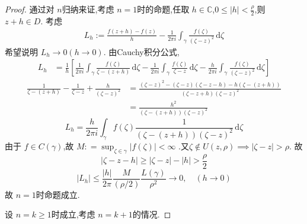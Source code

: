 \documentclass[../../复变函数.tex]{subfiles}
\begin{document}
\begin{proof}
    通过对 \(  n  \)归纳来证,考虑 \(  n = 1  \)时的命题,任取 \(  h \in \mathbb{C}   \),\(  0\le \left| h \right|<\frac{\rho  }{2 }    \),则 \(  z+ h\in D  \). 考虑\[
    \begin{aligned}
   L_{h}:=  \frac{f\left( z+ h \right)-f\left( z \right)   }{h }-\frac{1 }{2\pi i }\int_{ \gamma }\frac{f\left( \zeta  \right)  }{\left( \zeta -z \right)^{2}  }\,\mathrm{d} \zeta     
    \end{aligned}
    \]  希望说明 \(  L_{h}\to 0\left( h\to 0 \right)   \).   由Cauchy积分公式,  \[
    \begin{aligned}
    L_{h}& =  \frac{1}{h}\left[ \frac{1 }{2\pi i }\int_{ \gamma }\frac{f\left( \zeta  \right)  }{\zeta -\left( z+ h \right)  }\,\mathrm{d} \zeta -\frac{1 }{2\pi i }\int_{ \gamma }\frac{f\left( \zeta  \right)  }{\zeta -z }\,\mathrm{d} \zeta -\frac{h }{2\pi i } \int_{ \gamma }\frac{f\left( \zeta  \right)  }{\left( \zeta -z \right)^{2}  }\,\mathrm{d} \zeta        \right]  
    \end{aligned}
    \]
    \[
    \begin{aligned}
        \frac{1}{\zeta -\left( z+ h \right) }-\frac{1 }{\zeta -z }+ \frac{h }{\left( \zeta -z \right)^{2}   }& =  \frac{\left( \zeta -z \right)^{2}-\left( \zeta -z \right)\left( \zeta -z-h \right)-h\left( \zeta -\left( z+ h \right)  \right)     }{ \left( \zeta -z+ h \right)\left( \zeta -z \right)^{2}  }  \\ 
         & =  \frac{h^{2} }{\left( \zeta -\left( z+ h \right)  \right)\left( \zeta -z \right)^{2}   } 
    \end{aligned} 
    \] \[
    L_{h}= \frac{h }{2\pi i }\int_{ \gamma }f\left( \zeta  \right)\frac{1 }{\left( \zeta -\left( z+ h \right)  \right)\left( \zeta -z \right)^{2}   }   \,\mathrm{d} \zeta 
    \]由于 \(  f \in C\left(  \gamma  \right)   \),故 \(  M: =  \sup _{\zeta \in  \gamma }\left| f\left( \zeta  \right)  \right|< \infty   \) .又\(  \zeta \not \in U\left( z,\rho  \right)\implies  \left| \zeta -z \right|> \rho     \).   故 \[
    \left| \zeta -z-h \right| \ge \left| \zeta -z \right|-\left| h \right|> \frac{\rho  }{2 }    
    \] \[
    \left| L_{h} \right|\le \frac{\left| h \right|  }{2\pi  }\frac{M }{ \left( \rho  /2 \right) }\frac{L\left(  \gamma  \right)  }{\rho ^{2} }\to 0,\quad (h\to 0)    
    \]故 \(  n = 1  \)时命题成立.
    
    设 \(  n = k \ge 1  \)时成立,考虑 \(  n = k+ 1  \)的情况.  
    

\end{proof}
\end{document}
